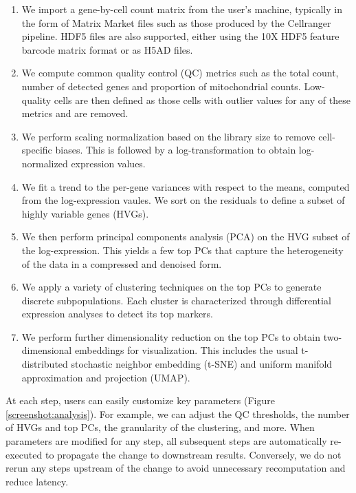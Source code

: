 \documentclass{article}
\begin{document}
\begin{enumerate}
\item We import a gene-by-cell count matrix from the user's machine, typically in the form of Matrix Market files such as those produced by the Cellranger pipeline.
HDF5 files are also supported, either using the 10X HDF5 feature barcode matrix format or as H5AD files.
\item We compute common quality control (QC) metrics such as the total count, number of detected genes and proportion of mitochondrial counts.
Low-quality cells are then defined as those cells with outlier values for any of these metrics and are removed.
\item We perform scaling normalization based on the library size to remove cell-specific biases.
This is followed by a log-transformation to obtain log-normalized expression values.
\item We fit a trend to the per-gene variances with respect to the means, computed from the log-expression vaules.
We sort on the residuals to define a subset of highly variable genes (HVGs). 
\item We then perform principal components analysis (PCA) on the HVG subset of the log-expression.
This yields a few top PCs that capture the heterogeneity of the data in a compressed and denoised form.
\item We apply a variety of clustering techniques on the top PCs to generate discrete subpopulations.
Each cluster is characterized through differential expression analyses to detect its top markers.
\item We perform further dimensionality reduction on the top PCs to obtain two-dimensional embeddings for visualization. 
This includes the usual t-distributed stochastic neighbor embedding (t-SNE) and uniform manifold approximation and projection (UMAP).
\end{enumerate}

At each step, users can easily customize key parameters (Figure \ref{screenshot:analysis}).
For example, we can adjust the QC thresholds, the number of HVGs and top PCs, the granularity of the clustering, and more.
When parameters are modified for any step, all subsequent steps are automatically re-executed to propagate the change to downstream results.
Conversely, we do not rerun any steps upstream of the change to avoid unnecessary recomputation and reduce latency.
\end{document}
